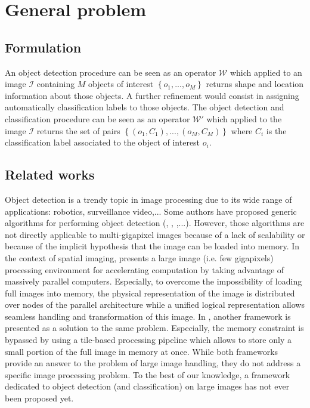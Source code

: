 \label{chap:context}
\section{General problem}
\subsection{Formulation}
An object detection procedure can be seen as an operator $\mathcal{W}$ which applied to an image $\mathcal{I}$ containing $M$ objects of interest $\left\{o_1,...,o_M\right\}$ returns shape and location information about those objects. A further refinement would consist in assigning automatically classification labels to those objects. The object detection and classification procedure can be seen as an operator $\mathcal{W}'$ which applied to the image $\mathcal{I}$ returns the set of pairs $\left\{\left(o_1, C_1\right), ..., \left(o_M, C_M\right)\right\}$ where $C_i$ is the classification label associated to the object of interest $o_i$. 

\subsection{Related works}
Object detection is a trendy topic in image processing due to its wide range of applications: robotics, surveillance video,...  Some authors have proposed generic algorithms for performing object detection (\cite{lecun2004learning}, \cite{opelt2006generic}, \cite{wang2013regionlets},...). However, those algorithms are not directly applicable to multi-gigapixel images because of a lack of scalability or because of the implicit hypothesis that the image can be loaded into memory. In the context of spatial imaging, \cite{jones2003gigapixel} presents a large image (i.e. few gigapixels) processing environment for accelerating computation by taking advantage of massively parallel computers. Especially, to overcome the impossibility of loading full images into memory, the physical representation of the image is distributed over nodes of the parallel architecture while a unified logical representation allows seamless handling and transformation of this image. In \cite{powell2010scalable}, another framework is presented as a solution to the same problem. Especially, the memory constraint is bypassed by using a tile-based processing pipeline which allows to store only a small portion of the full image in memory at once. While both frameworks provide an answer to the problem of large image handling, they do not address a specific image processing problem. To the best of our knowledge, a framework dedicated to object detection (and classification) on large images has not ever been proposed yet.

